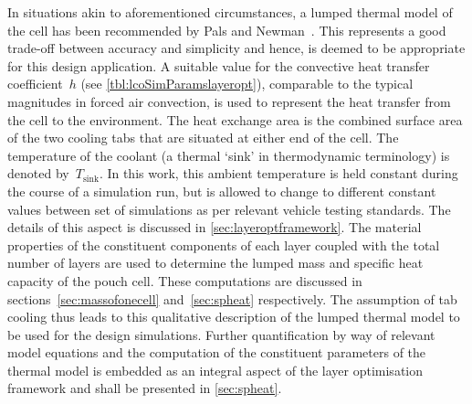 In  situations akin  to  aforementioned circumstances,  a  lumped thermal  model
of  the cell  has  been  recommended by  Pals  and Newman~\cite{Pals1995}.  This
represents a good trade-off between accuracy and simplicity and hence, is deemed
to  be  appropriate for  this  design  application.  A  suitable value  for  the
convective heat transfer  coefficient~$h$ (see \cref{tbl:lcoSimParamslayeropt}),
comparable  to the  typical  magnitudes in  forced air  convection,  is used  to
represent the heat transfer from the  cell to the environment. The heat exchange
area is the combined  surface area of the two cooling tabs  that are situated at
either end  of the  cell. The temperature  of the coolant  (a thermal  `sink' in
thermodynamic  terminology) is  denoted by~$T_\text{sink}$.  In this  work, this
ambient temperature is held constant during  the course of a simulation run, but
is allowed  to change to  different constant  values between set  of simulations
as  per relevant  vehicle  testing  standards. The  details  of  this aspect  is
discussed  in  \cref{sec:layeroptframework}.  The  material  properties  of  the
constituent components  of each layer  coupled with  the total number  of
layers are used  to determine  the  lumped  mass  and specific  heat  capacity 
of  the  pouch cell.  These  computations  are  discussed  in 
sections~\ref{sec:massofonecell} and~\ref{sec:spheat} respectively. The 
assumption of tab cooling  thus leads to this qualitative  description of  the
lumped  thermal model to  be used  for the design simulations.  Further
quantification by  way of relevant  model equations and  the computation  of 
the constituent  parameters of  the  thermal model  is embedded as an integral
aspect of  the layer optimisation framework and shall be presented in
\cref{sec:spheat}.

